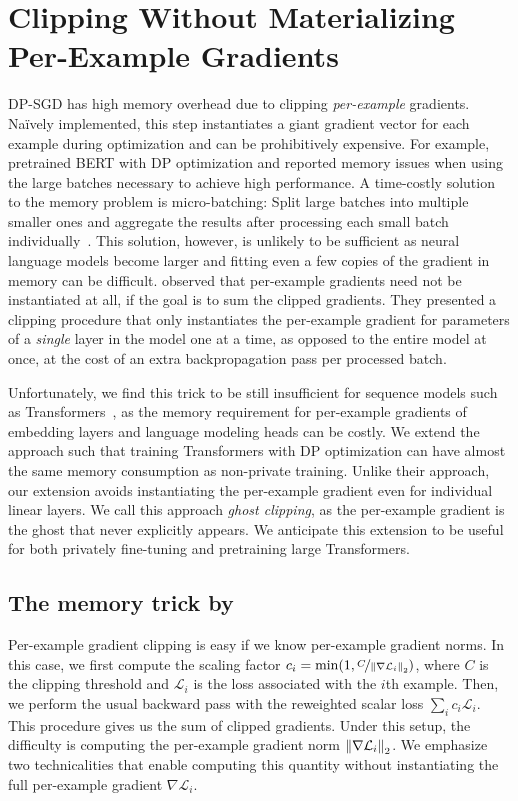 
\section{\large Clipping Without Materializing Per-Example Gradients}
DP-SGD has high memory overhead due to clipping \textit{per-example} gradients.
Na\"ively implemented, this step instantiates a giant gradient vector for each example during optimization and can be prohibitively expensive.
For example, \cite{hoory2021learning} pretrained BERT with DP optimization and reported memory issues when using the large batches necessary to achieve high performance.
A time-costly solution to the memory problem is micro-batching: Split large batches into multiple smaller ones and aggregate the results after processing each small batch individually~\citep{tramer2020differentially}.
This solution, however, is unlikely to be sufficient as neural language models become larger and fitting even a few copies of the gradient in memory can be difficult.
\cite{lee2020scaling} observed that per-example gradients need not be instantiated at all, if the goal is to sum the clipped gradients. 
They presented a clipping procedure that only instantiates the per-example gradient for parameters of a \textit{single} layer in the model one at a time, as opposed to the entire model at once, at the cost of an extra backpropagation pass per processed batch. 


Unfortunately, we find this trick to be still insufficient for sequence models such as Transformers~\citep{vaswani2017attention}, as the memory requirement for per-example gradients of embedding layers and language modeling heads can be costly. We extend the \cite{lee2020scaling} approach such that training Transformers with DP optimization can have almost the same memory consumption as non-private training. 
Unlike their approach, our extension avoids instantiating the per-example gradient even for individual linear layers.
We call this approach \textit{ghost clipping}, as the per-example gradient is the ghost that never explicitly appears.
We anticipate this extension to be useful for both privately fine-tuning and pretraining large Transformers.

\subsection{The memory trick by~\cite{lee2020scaling}}
Per-example gradient clipping is easy if we know per-example gradient norms. In this case, we first compute the scaling factor $c_i = \min(1, \nicefrac{C}{ \left\lVert \nabla \mathcal{L}_i\right\rVert_2 })$, where $C$ is the clipping threshold and $\mathcal{L}_i$ is the loss associated with the $i$th example. Then, we perform the usual backward pass with the reweighted scalar loss $ \sum_{i} c_i \mathcal{L}_i $. This procedure gives us the sum of clipped gradients.
Under this setup, the difficulty is computing the per-example gradient norm $\left\lVert\nabla \mathcal{L}_i\right\rVert_2$. 
We emphasize two technicalities that enable computing this quantity without instantiating the full per-example gradient $\nabla \mathcal{L}_i$. 

